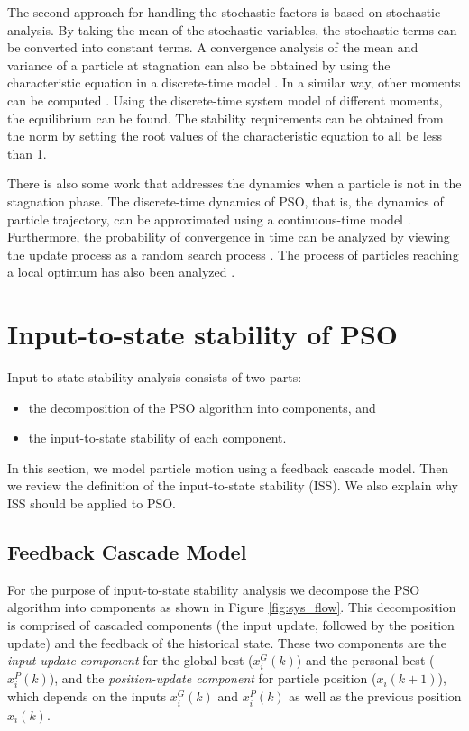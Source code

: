\documentclass{sig-alternate}
\begin{document}
The second approach for handling the stochastic factors is based on stochastic analysis.
By taking the mean of the stochastic variables, the stochastic terms can be converted into
constant terms.
A convergence analysis of the mean and variance of a particle at stagnation can also be obtained by using the characteristic equation in a discrete-time model 
\cite{Jiang20078}.
In a similar way, 
other moments can be computed
\cite{5175367,Poli:2007:EAS:1276958.1276977,Poli:2008:DSS:1384929.1384944}.
Using the discrete-time system model of different moments, the equilibrium can be found.
The stability requirements can be obtained from the norm by setting the root values of the characteristic equation to all be less than 1.

There is also some work that addresses the dynamics when a particle is not in the stagnation phase.
The discrete-time dynamics of PSO, that is, the dynamics of particle trajectory, can be approximated
using a continuous-time model
\cite{5675669}.
Furthermore, the probability of convergence in time can be analyzed
by viewing the update process as a random search process
\cite{vandenBergh:2010:CPP:2010420.2010421}.
The process of particles reaching a local optimum
has also been analyzed
\cite{Schmitt:2013:PSO:2463372.2463563}.

\section{Input-to-state stability of PSO}
\label{sec:sys_model}

Input-to-state stability analysis consists of two parts:
\begin{itemize}
\item the decomposition of the PSO algorithm into components, and
\item the input-to-state stability of each component.
\end{itemize}
In this section, we model particle motion using a feedback cascade model.
Then we review the definition of the input-to-state stability (ISS).
We also explain why ISS should be applied to PSO.

\subsection{Feedback Cascade Model}
\label{sec:feedback_cascade_model}

For the purpose of input-to-state stability analysis we decompose the PSO algorithm into components as shown in Figure \ref{fig:sys_flow}. This decomposition is comprised of cascaded components (the input update, followed by the position update) and the feedback of the historical state.
These two components are the 
\emph{input-update component} for the global best ($ x^{G}_{i}(k) $) and the personal best ($ x^{P}_{i}(k) $), and the 
\emph{position-update component} for particle position ($ x_{i}(k+1) $), which depends on the inputs $ x^{G}_{i}(k) $ and $ x^{P}_{i}(k) $ as well as the previous position $ x_{i}(k) $.
\end{document}

